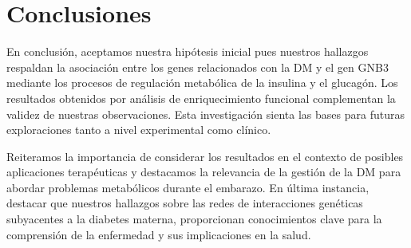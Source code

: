 \section{Conclusiones}

En conclusión, aceptamos nuestra hipótesis inicial pues nuestros hallazgos respaldan la asociación entre los genes relacionados con la DM y el gen GNB3 mediante los procesos de regulación metabólica de la insulina y el glucagón. Los resultados obtenidos por análisis de enriquecimiento funcional complementan la validez de nuestras observaciones.
Esta investigación sienta las bases para futuras exploraciones tanto a nivel experimental como clínico.

Reiteramos la importancia de considerar los resultados en el contexto de posibles aplicaciones terapéuticas y destacamos la relevancia de la gestión de la DM para abordar problemas metabólicos durante el embarazo. 
En última instancia, destacar que nuestros hallazgos sobre las redes de interacciones genéticas subyacentes a la diabetes materna, proporcionan conocimientos clave para la comprensión de la enfermedad y sus implicaciones en la salud.

